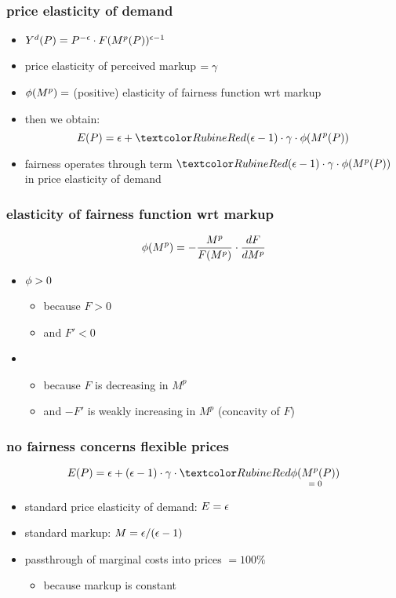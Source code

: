 \documentclass[12pt,xcolor={dvipsnames},hyperref={pdftex,pdfpagemode=UseNone,hidelinks,pdfdisplaydoctitle=true},usepdftitle=false]{beamer}
\begin{document}
\begin{frame}
\frametitle{price elasticity of demand}
\begin{itemize}
\item $Y^d(P) = P^{-\epsilon}  \cdot F(M^p(P))^{\epsilon-1}$
\item price elasticity of perceived markup $=\gamma$
\item $\phi(M^p) = $ (positive) elasticity of fairness function wrt markup
\item then we obtain:
\begin{equation*}
E(P) = \e+ \al{(\e-1)  \cdot  \g \cdot \f(M^p(P))}
\end{equation*}
\item fairness operates through term $\al{(\e-1)  \cdot  \g \cdot \f(M^p(P))}$ in price elasticity of demand
\end{itemize}
\end{frame}

\begin{frame}
\frametitle{elasticity of fairness function wrt markup}
\begin{equation*}
\phi(M^p) = - \frac{M^p}{F(M^p)}\cdot \frac{d F}{d M^p}
\end{equation*}
\begin{itemize}
\item $\phi>0$
\begin{itemize}
\item because $F>0$
\item and $F'<0$
\end{itemize}
\item {}
\begin{itemize}
\item because $F$ is decreasing in $M^p$
\item and $-F'$ is weakly increasing in $M^p$ (concavity of $F$)
\end{itemize}
\end{itemize}
\end{frame}

\begin{frame}
\frametitle{no fairness concerns \then flexible prices}
\begin{equation*}
E(P) = \e+ (\e-1) \cdot  \g \cdot \al{\underset{=\;0}{\f(M^p(P))}}
\end{equation*}
\begin{itemize}
\item standard price elasticity of demand: $E=\epsilon$
\item standard markup: $M=\epsilon/(\epsilon-1)$
\item passthrough of marginal costs into prices $= 100\%$
\begin{itemize}
\item because markup is constant
\end{itemize}
\end{itemize}
\end{frame}
\end{document}
